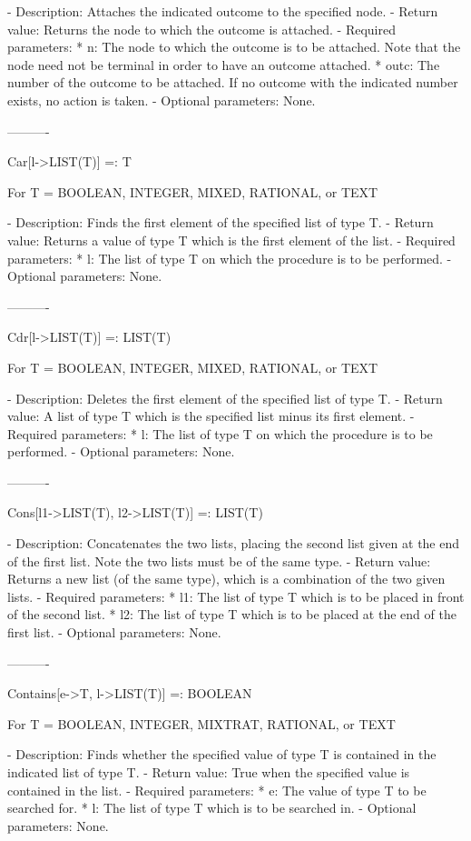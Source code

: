 {   -	Description:  Attaches the indicated outcome to the specified node.  
   -	Return value:  Returns the node to which the outcome is attached.
   -	Required parameters:
	  *  n:  The node to which the outcome is to be attached.  Note that
		the node need not be terminal in order to have an outcome 
		attached.
	  *  outc:  The number of the outcome to be attached.  If no outcome 
		with the indicated number exists, no action is taken.  
   -	Optional parameters:  None.

----------

Car[l->LIST(T)] =: T	

	For T = BOOLEAN, INTEGER, MIXED, RATIONAL, or TEXT

   -	Description:  Finds the first element of the specified list of type T.
   -	Return value:  Returns a value of type T which is the first element of 
	the list.
   -	Required parameters:
	  *  l:  The list of type T on which the procedure is to be performed.
   -	Optional parameters:  None.

----------

Cdr[l->LIST(T)] =: LIST(T)

	For T = BOOLEAN, INTEGER, MIXED, RATIONAL, or TEXT

   -	Description:  Deletes the first element of the specified list of type 
	T.
   -	Return value:  A list of type T which is the specified list minus its
	first element.
   -	Required parameters:
	  *  l:  The list of type T on which the procedure is to be performed.
   -	Optional parameters:  None.

----------

Cons[l1->LIST(T), l2->LIST(T)] =: LIST(T)

   -	Description:  Concatenates the two lists, placing the second list given
	at the end of the first list.  Note the two lists must be of the same
	type.
   -	Return value:  Returns a new list (of the same type), which is a 
	combination of the two given lists.
   -	Required parameters:
	  *  l1:  The list of type T which is to be placed in front of the
		second list.
	  *  l2:  The list of type T which is to be placed at the end of the
		first list.
   -	Optional parameters:  None.

----------

Contains[e->T, l->LIST(T)] =: BOOLEAN

	For T = BOOLEAN, INTEGER, MIXTRAT, RATIONAL, or TEXT

   -	Description:  Finds whether the specified value of type T is contained 
	in the indicated list of type T.
   -	Return value:  True when the specified value is contained in the list.
   -	Required parameters:
	  *  e:  The value of type T to be searched for.
	  *  l:  The list of type T which is to be searched in.
   -	Optional parameters:  None.

}
